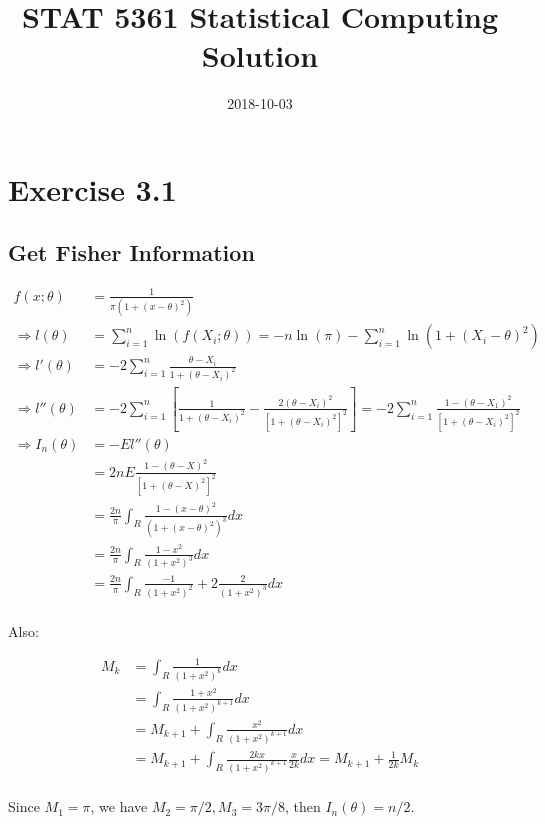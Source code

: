 \documentclass[]{book}
\title{STAT 5361 Statistical Computing Solution}
\author{}
\date{2018-10-03}
\theoremstyle{definition}
\theoremstyle{definition}
\theoremstyle{definition}
\theoremstyle{remark}
\begin{document}
\maketitle

{
\setcounter{tocdepth}{1}
\tableofcontents
}
\chapter{Exercise 3.1}\label{exercise-3.1}

\section{Get Fisher Information}\label{get-fisher-information}

\begin{align*}
f(x;\theta) &= \frac{1}{\pi(1+(x-\theta)^2)}\\
\Rightarrow l(\theta) &= \sum_{i = 1}^n \ln(f(X_i;\theta)) = -n\ln(\pi) - 
\sum_{i = 1}^n\ln(1+(X_i-\theta)^2)\\
\Rightarrow l'(\theta) &= -2\sum_{i = 1}^n\frac{\theta-X_i}{1+(\theta-X_i)^2}\\
\Rightarrow l''(\theta) &= -2\sum_{i = 1}^n[\frac{1}{1+(\theta-X_i)^2} - \frac{2(\theta-X_i)^2}{[1+(\theta - X_i)^2]^2}] = -2\sum_{i = 1}^n\frac{1-(\theta-X_1)^2}{[1+(\theta-X_i)^2]^2}\\
\Rightarrow I_n(\theta) &= -El''(\theta)\\
&= 2nE\frac{1-(\theta - X)^2}{[1+(\theta-X)^2]^2}\\
&=\frac{2n}{\pi}\int_R\frac{1-(x-\theta)^2}{(1+(x-\theta)^2)^3}dx\\
&=\frac{2n}{\pi}\int_R\frac{1-x^2}{(1+x^2)^3}dx\\
&= \frac{2n}{\pi}\int_R\frac{-1}{(1+x^2)^2}+2\frac{2}{(1+x^2)^3}dx\\
\end{align*}

Also:

\begin{align*}
M_k &= \int_R\frac{1}{(1+x^2)^k}dx\\
&= \int_R\frac{1+x^2}{(1+x^2)^{k+1}}dx\\
&= M_{k+1} + \int_R\frac{x^2}{(1+x^2)^{k+1}}dx\\
&= M_{k+1} + \int_R\frac{2kx}{(1+x^2)^{k+1}}\frac{x}{2k}dx = M_{k+1}+\frac{1}{2k}M_k\\
\end{align*}

Since \(M_1 = \pi\), we have \(M_2 = \pi/2, M_3 = 3\pi/8\), then
\(I_n(\theta) = n/2\).
\end{document}
